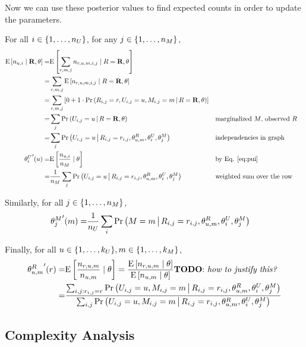 \documentclass{article}
\begin{document}
Now we can use these posterior values to find expected counts in order
to update the parameters.

For all $i \in {\left\{ 1, \dots, n_U \right\}}$, for any $j \in {\left\{ 1, \dots, n_M \right\}}$,
\begin{align}
  {\textrm{E} \left[ n_{u,i} \mid {\bf R}, \theta \right]}
  =& {\textrm{E} \left[  \sum_{r,m,j} n_{r,u,m,i,j}  \mid R = {\bf R}, \theta \right]} \\
  =& \sum_{r,m,j} {\textrm{E} \left[  n_{r,u,m,i,j}  \mid R = {\bf R}, \theta \right]} \\
  =& \sum_{r,m,j} \left[
    0 + 1 \cdot {{\Pr \left(   R_{i,j} = r, U_{i,j} = u, M_{i,j} = m  \,\middle|\, R = {\bf R}, \theta  \right)}}
  \right] \\
  =& \sum_j {{\Pr \left(  U_{i,j} = u \,\middle|\, R = {\bf R}, \theta  \right)}}
  && \text{marginalized $M$, observed $R$} \\
  =& \sum_j {{\Pr \left(  U_{i,j} = u \,\middle|\, R_{i,j} = r_{i,j}, \theta^R_{u,m},
    \theta^U_i, \theta^M_j  \right)}}
  && \text{independencies in graph} \\
  {\theta^U_i}'(u)
  =& {\textrm{E} \left[  \frac{ n_{u,i}}{ n_M }  \mid \theta \right]} && \text{by Eq. \ref{eq:pui}} \\
  =& \frac{1}{n_M} \sum_j {{\Pr \left(  U_{i,j} = u \,\middle|\,  R_{i,j} = r_{i,j}, \theta^R_{u,m},
    \theta^U_i, \theta^M_j   \right)}}
  && \text{weighted sum over the row}
\end{align}

Similarly, for all $j \in {\left\{ 1, \dots, n_M \right\}}$,
\begin{align}
  {\theta^M_j}'(m) =&
  \frac{1}{n_U} \sum_i {{\Pr \left(  M = m \,\middle|\, 
    R_{i,j} = r_{i,j}, \theta^R_{u,m}, \theta^U_i, \theta^M_j  \right)}}
\end{align}

Finally, for all $u \in {\left\{ 1, \dots, k_U \right\}}, m \in {\left\{ 1, \dots, k_M \right\}}$,
\begin{align}
  {\theta^R_{u,m}}'(r)
  =& {\textrm{E} \left[  \frac{n_{r,u,m}}{n_{u,m}}  \mid \theta \right]}
  = \frac{ {\textrm{E} \left[ n_{r,u,m}  \mid \theta \right]} }{ {\textrm{E} \left[ n_{u,m} \mid \theta \right]} }
   \text{{\textbf{TODO}: \textit{how to justify this?}}} \\
  =& \frac{\sum_{i,j: r_{i,j} = r} {{\Pr \left(  U_{i,j} = u, M_{i,j} = m \,\middle|\, 
      R_{i,j} = r_{i,j}, \theta^R_{u,m}, \theta^U_i, \theta^M_j  \right)}}
  }{ \sum_{i,j} {{\Pr \left(  U_{i,j} = u, M_{i,j} = m \,\middle|\, 
      R_{i,j} = r_{i,j}, \theta^R_{u,m}, \theta^U_i, \theta^M_j  \right)}} } \\
\end{align}

\subsection{Complexity Analysis}

\end{document}
